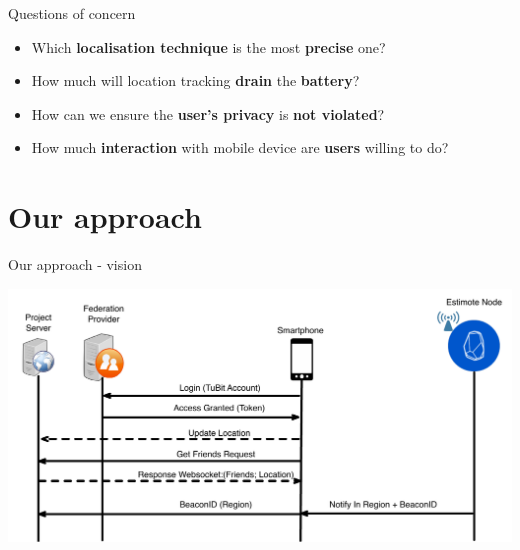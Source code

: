 \documentclass[9pt]{beamer}
\begin{document}
\begin{frame}{Questions of concern}

	\begin{itemize}
	
		\item Which \textbf{localisation technique} is the most \textbf{precise} one?
		\item How much will location tracking \textbf{drain} the \textbf{battery}?
		\item How can we ensure the \textbf{user's privacy} is \textbf{not violated}?
		\item How much \textbf{interaction} with mobile device are \textbf{users} willing to do?
		
	\end{itemize}

\end{frame}

\section{Our approach}

\begin{frame}{Our approach - vision}

	\begin{center}

		\includegraphics[width=\textwidth]{Version2_Region_LiveLocationUpdate_2}
	
	\end{center}

\end{frame}
\end{document}
